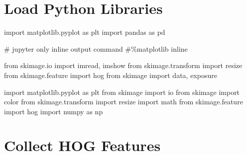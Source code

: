 \documentclass[
  letterpaper,
]{report}
\newenvironment{Shaded}{\begin{snugshade}}{\end{snugshade}}
\newcommand{\CommentTok}[1]{\textcolor[rgb]{0.37,0.37,0.37}{#1}}
\newcommand{\ImportTok}[1]{\textcolor[rgb]{0.00,0.46,0.62}{#1}}
\newcommand{\NormalTok}[1]{\textcolor[rgb]{0.00,0.23,0.31}{#1}}
\begin{document}
\hypertarget{load-python-libraries}{%
\section{Load Python Libraries}\label{load-python-libraries}}

\begin{Shaded}
\begin{Highlighting}[]

\ImportTok{import}\NormalTok{ matplotlib.pyplot }\ImportTok{as}\NormalTok{ plt}
\ImportTok{import}\NormalTok{ pandas }\ImportTok{as}\NormalTok{ pd}

\CommentTok{\# jupyter only inline output command}
\CommentTok{\#\%matplotlib inline}

\ImportTok{from}\NormalTok{ skimage.io }\ImportTok{import}\NormalTok{ imread, imshow}
\ImportTok{from}\NormalTok{ skimage.transform }\ImportTok{import}\NormalTok{ resize}
\ImportTok{from}\NormalTok{ skimage.feature }\ImportTok{import}\NormalTok{ hog}
\ImportTok{from}\NormalTok{ skimage }\ImportTok{import}\NormalTok{ data, exposure}


\ImportTok{import}\NormalTok{ matplotlib.pyplot }\ImportTok{as}\NormalTok{ plt}
\ImportTok{from}\NormalTok{ skimage }\ImportTok{import}\NormalTok{ io}
\ImportTok{from}\NormalTok{ skimage }\ImportTok{import}\NormalTok{ color}
\ImportTok{from}\NormalTok{ skimage.transform }\ImportTok{import}\NormalTok{ resize}
\ImportTok{import}\NormalTok{ math}
\ImportTok{from}\NormalTok{ skimage.feature }\ImportTok{import}\NormalTok{ hog}
\ImportTok{import}\NormalTok{ numpy }\ImportTok{as}\NormalTok{ np}
\end{Highlighting}
\end{Shaded}

\hypertarget{collect-hog-features}{%
\section{Collect HOG Features}\label{collect-hog-features}}
\end{document}
